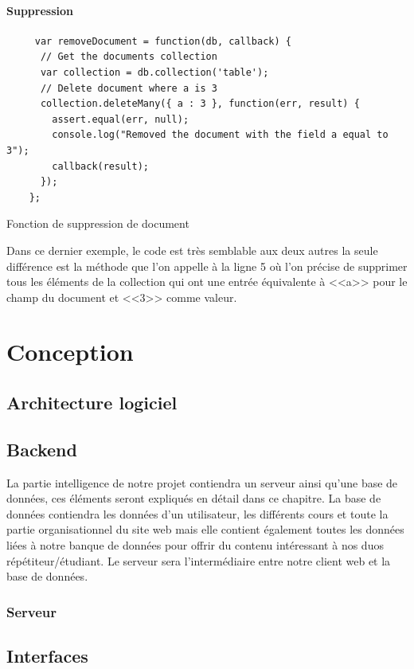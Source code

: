 \documentclass[a4paper]{scrreprt}
\begin{document}
\subsubsection{Suppression}
\begin{listing}[H]
	\begin{verbatim}	
     var removeDocument = function(db, callback) {
      // Get the documents collection
      var collection = db.collection('table');
      // Delete document where a is 3
      collection.deleteMany({ a : 3 }, function(err, result) {
        assert.equal(err, null);
        console.log("Removed the document with the field a equal to 3");
        callback(result);
      });    
    };
	\end{verbatim}
	\caption{Fonction de suppression de document}
	\label{lst:delete_mongoDB}
\end{listing}
Dans ce dernier exemple, le code est très semblable aux deux autres la seule différence est la méthode que l'on appelle à la ligne 5 où l'on précise de supprimer tous les éléments de la collection qui ont une entrée équivalente à <<a>> pour le champ du document et <<3>> comme valeur.


\chapter{Conception}
\section{Architecture logiciel}

\section{Backend}
La partie intelligence de notre projet contiendra un serveur ainsi qu'une base de données, ces éléments seront expliqués en détail dans ce chapitre. La base de données contiendra les données d'un utilisateur, les différents cours et toute la partie organisationnel du site web mais elle contient également toutes les données liées à notre banque de données pour offrir du contenu intéressant à nos duos répétiteur/étudiant. Le serveur sera l'intermédiaire entre notre client web et la base de données.
\subsection{Serveur}


\section{Interfaces}
\end{document}
